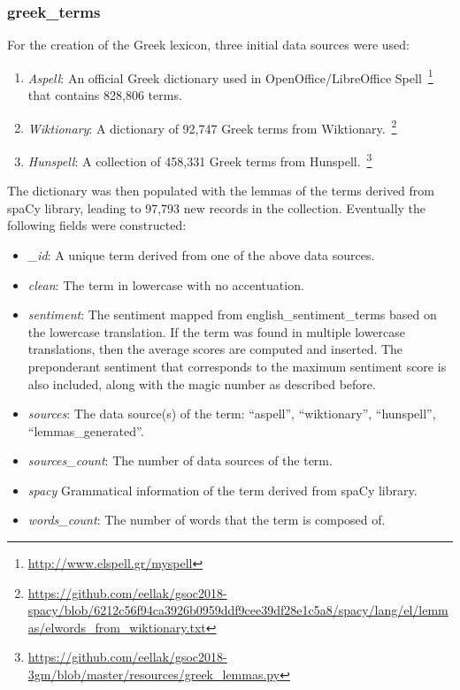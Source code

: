 \subsubsection{greek\_terms}
\label{subsubsec:greek-terms}

For the creation of the Greek lexicon,
three initial data sources were used:

\begin{enumerate}
 \item \emph{Aspell}: An official Greek dictionary used in OpenOffice/LibreOffice Spell~\footnote{\url {http://www.elspell.gr/myspell}}
 that contains 828,806 terms.
    
 \item \emph{Wiktionary}: A dictionary of 92,747 Greek terms from Wiktionary.~\footnote{\url {https://github.com/eellak/gsoc2018-spacy/blob/6212c56f94ca3926b0959ddf9cee39df28e1c5a8/spacy/lang/el/lemmas/elwords_from_wiktionary.txt}}

 \item \emph{Hunspell}: A collection of 458,331 Greek terms from Hunspell.~\footnote{\url {https://github.com/eellak/gsoc2018-3gm/blob/master/resources/greek_lemmas.py}}
\end{enumerate}

The dictionary was then populated with the lemmas of the terms
derived from spaCy library, leading to 97,793 new records in the collection.
Eventually the following fields were constructed:

\begin{itemize}
 \item \emph{\_id}: A unique term derived from one of the above data sources.
 
 \item \emph{clean}: The term in lowercase with no accentuation.
 
 \item \emph{sentiment}: The sentiment mapped from english\_sentiment\_terms
 based on the lowercase translation.
 If the term was found in multiple lowercase translations,
 then the average scores are computed and inserted.
 The preponderant sentiment that corresponds to the maximum sentiment score
 is also included, along with the magic number as described before.
 
 \item \emph{sources}: The data source(s) of the term:
 ``aspell'', ``wiktionary'', ``hunspell'', ``lemmas\_generated''.
 
 \item \emph{sources\_count}: The number of data sources of the term.
 
 \item \emph{spacy} Grammatical information of the term
 derived from spaCy library.
 
 \item \emph{words\_count}: The number of words that the term is composed of.
\end{itemize}

